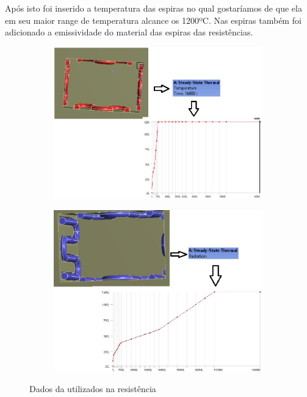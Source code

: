 Após isto foi inserido a temperatura das espiras no qual gostaríamos de que ela em seu
maior range de temperatura alcance os 1200ºC. Nas espiras também foi adicionado a emissividade
do material das espiras das resistências.
\begin{figure}[H]
\centering
    \begin{subfigure}{0.49\linewidth} \centering
        \includegraphics[scale=0.5]{figuras/ansys10.jpg}
        \label{ansys10}
    \end{subfigure}
    \begin{subfigure}{0.49\linewidth} \centering
        \includegraphics[scale=0.5]{figuras/ansys6.jpg}
        \label{ansys6}
    \end{subfigure}
    \caption{Dados da utilizados na resistência}
\end{figure}

